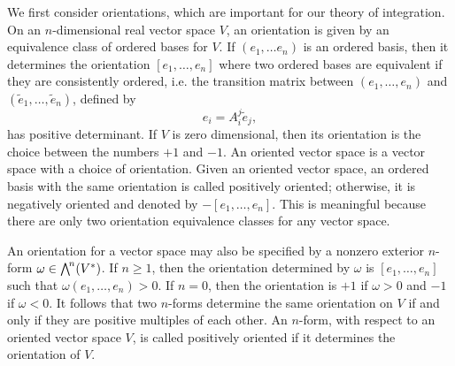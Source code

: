 \documentclass[a4paper,12pt]{article}
\begin{document}
We first consider orientations, which are important for our theory of integration.
On an $n$-dimensional real vector space $V$, an orientation is given by an equivalence class of ordered bases for $V$.
If $(e_1, \ldots e_n)$ is an ordered basis, then it determines the orientation $[e_1, \ldots, e_n]$ where two ordered bases are equivalent if they are consistently ordered, i.e. the transition matrix between $(e_1, \ldots, e_n)$ and $(\tilde{e}_1, \ldots, \tilde{e}_n)$, defined by
\begin{equation}
   e_i = A^j_i \tilde{e}_j,
\end{equation}
has positive determinant.
If $V$ is zero dimensional, then its orientation is the choice between the numbers $+1$ and $-1$.
An oriented vector space is a vector space with a choice of orientation.
Given an oriented vector space, an ordered basis with the same orientation is called positively oriented; otherwise, it is negatively oriented and denoted by $-[e_1, \ldots, e_n]$.
This is meaningful because there are only two orientation equivalence classes for any vector space.

An orientation for a vector space may also be specified by a nonzero exterior $n$-form $\omega \in \extp^n(V^*)$.
If $n \geq 1$, then the orientation determined by $\omega$ is $[e_1, \ldots, e_n]$ such that $\omega(e_1, \ldots, e_n) > 0$.
If $n = 0$, then the orientation is $+1$ if $\omega > 0$ and $-1$ if $\omega < 0$.
It follows that two $n$-forms determine the same orientation on $V$ if and only if they are positive multiples of each other.
An $n$-form, with respect to an oriented vector space $V$, is called positively oriented if it determines the orientation of $V$.
\end{document}
